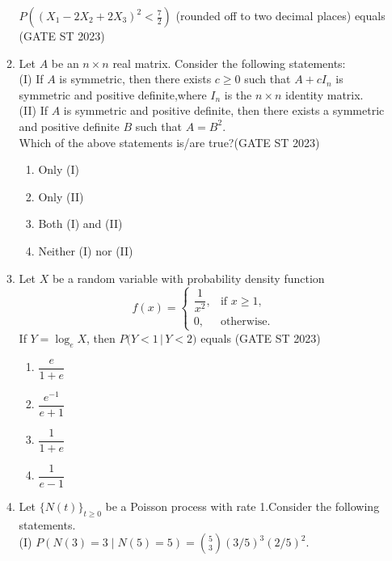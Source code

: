 \documentclass[journal]{IEEEtran}
\begin{document}
\begin{enumerate}[label=\textbf{Q.\arabic*.}, start=1, align=left, itemsep=2em]
\begin{enumerate}[label=\textbf{Q.\arabic*.}, start=11, align=left, itemsep=2em]
$P\left( (X_1 - 2X_2 + 2X_3)^2 < \frac{7}{2} \right)$ (rounded off to two decimal places) equals \underline{\hspace{3cm}}\hfill(GATE ST 2023)


\item Let $A$ be an $n\times n$ real matrix. Consider the following statements: \\

(I) If $A$ is symmetric, then there exists $c \ge 0$ such that $A + c I_n$ is symmetric and positive definite,where $I_n$ is the $n\times n$ identity matrix. \\

(II) If $A$ is symmetric and positive definite, then there exists a symmetric and positive definite $B$ such that $A = B^2$. \\

Which of the above statements is/are true?\hfill(GATE ST 2023)
\begin{enumerate}[label=(\Alph*)]
\item Only (I)
\item Only (II)
\item Both (I) and (II)
\item Neither (I) nor (II)
\end{enumerate}

\item Let $X$ be a random variable with probability density function  
\[
f(x) =
\begin{cases}
\dfrac{1}{x^{2}}, & \text{if } x \ge 1, \\
0, & \text{otherwise}.
\end{cases}
\]
If $Y = \log_{e} X$, then $P\big(Y < 1 \,\big|\, Y < 2\big)$ equals  \hfill(GATE ST 2023)

\begin{enumerate}[label=(\Alph*)]
    \item $\dfrac{e}{1+e}$
    \item $\dfrac{e^{-1}}{e+1}$
    \item $\dfrac{1}{1+e}$
    \item $\dfrac{1}{e-1}$
\end{enumerate}


\item Let $\{N(t)\}_{t\ge0}$ be a Poisson process with rate 1.Consider the following statements.\\

(I) $P(N(3)=3 \mid N(5)=5) = {5\choose3} (3/5)^3 (2/5)^2$.  \\


\end{enumerate}
\end{enumerate}
\end{document}
